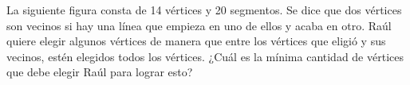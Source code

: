 La siguiente figura consta de 14 vértices y 20 segmentos. Se dice que dos vértices son vecinos si hay una línea que empieza en uno de ellos y acaba en otro. Raúl quiere elegir algunos vértices de manera que entre los vértices que eligió y sus vecinos, estén elegidos todos los vértices. ¿Cuál es la mínima cantidad de vértices que debe elegir Raúl para lograr esto?